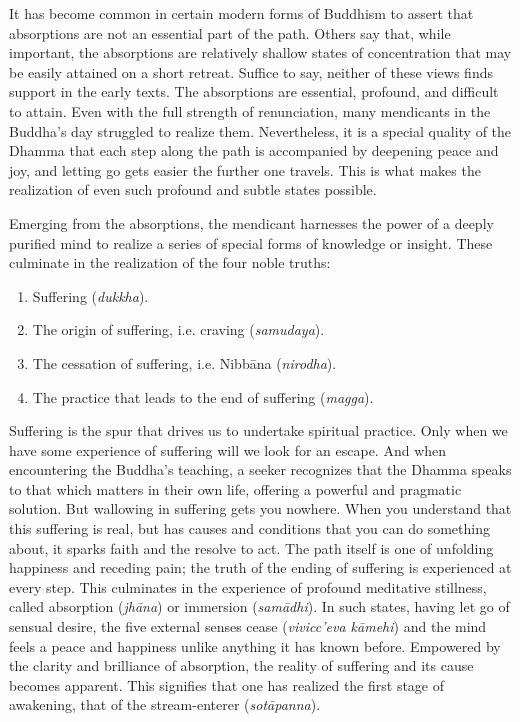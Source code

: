 \documentclass[12pt,openany]{book}%
\begin{document}
It has become common in certain modern forms of Buddhism to assert that absorptions are not an essential part of the path. Others say that, while important, the absorptions are relatively shallow states of concentration that may be easily attained on a short retreat. Suffice to say, neither of these views finds support in the early texts. The absorptions are essential, profound, and difficult to attain. Even with the full strength of renunciation, many mendicants in the Buddha’s day struggled to realize them. Nevertheless, it is a special quality of the Dhamma that each step along the path is accompanied by deepening peace and joy, and letting go gets easier the further one travels. This is what makes the realization of even such profound and subtle states possible.

Emerging from the absorptions, the mendicant harnesses the power of a deeply purified mind to realize a series of special forms of knowledge or insight. These culminate in the realization of the four noble truths:

\begin{enumerate}%
\item Suffering (\textit{dukkha}).%
\item The origin of suffering, i.e. craving (\textit{samudaya}).%
\item The cessation of suffering, i.e. \textsanskrit{Nibbāna} (\textit{nirodha}).%
\item The practice that leads to the end of suffering (\textit{magga}).%
\end{enumerate}

Suffering is the spur that drives us to undertake spiritual practice. Only when we have some experience of suffering will we look for an escape. And when encountering the Buddha’s teaching, a seeker recognizes that the Dhamma speaks to that which matters in their own life, offering a powerful and pragmatic solution. But wallowing in suffering gets you nowhere. When you understand that this suffering is real, but has causes and conditions that you can do something about, it sparks faith and the resolve to act. The path itself is one of unfolding happiness and receding pain; the truth of the ending of suffering is experienced at every step. This culminates in the experience of profound meditative stillness, called absorption (\textit{\textsanskrit{jhāna}}) or immersion (\textit{\textsanskrit{samādhi}}). In such states, having let go of sensual desire, the five external senses cease (\textit{vivicc’eva \textsanskrit{kāmehi}}) and the mind feels a peace and happiness unlike anything it has known before. Empowered by the clarity and brilliance of absorption, the reality of suffering and its cause becomes apparent. This signifies that one has realized the first stage of awakening, that of the stream-enterer (\textit{\textsanskrit{sotāpanna}}).
\end{document}
